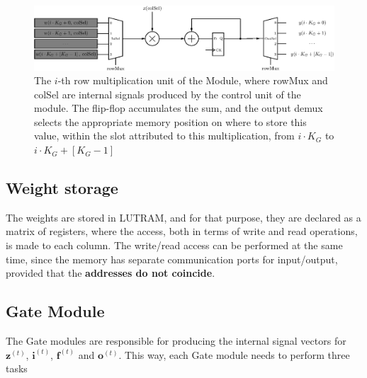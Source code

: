 \documentclass{IEEEtran}
\newcommand{\mb}[1]{\mathbf{#1}}
\begin{document}
\begin{figure}[!t]
    \centering
    \includegraphics[width=\linewidth]{figures/array-prod.eps}
    \caption{The $i$-th row multiplication unit of the Module, where rowMux and colSel are internal signals produced by the control unit of the module. The flip-flop accumulates the sum, and the output demux selects the appropriate memory position on where to store this value, within the slot attributed to this multiplication, from $i\cdot K_G$ to $i\cdot K_G + \left[K_G-1\right]$}
    \label{fig:array-prod}
\end{figure}

\subsection{Weight storage}\label{sec:proprarch_ram}
The weights are stored in LUTRAM, and for that purpose, they are declared as a matrix of registers, where the access, both in terms
of write and read operations, is made to each column. The write/read access can be performed at the same time, since the memory has
separate communication ports for input/output, provided that the \textbf{addresses do not coincide}.

\subsection{Gate Module}\label{sec:proparch_gate}
The Gate modules are responsible for producing the internal signal vectors for $\mb{z}^{(t)}$, $\mb{i}^{(t)}$, $\mb{f}^{(t)}$ and $\mb{o}^{(t)}$. This way,
each Gate module needs to perform three tasks
\end{document}

